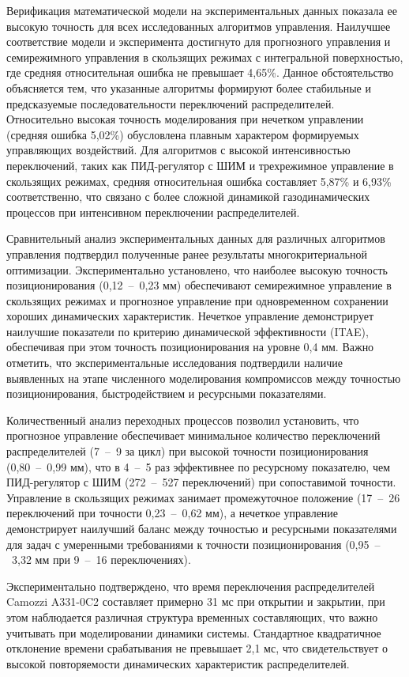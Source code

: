 Верификация математической модели на экспериментальных данных показала ее высокую точность для всех
исследованных алгоритмов управления. Наилучшее соответствие модели и эксперимента достигнуто для прогнозного
управления и семирежимного управления в скользящих режимах с интегральной поверхностью, где средняя относительная
ошибка не превышает 4,65\%. Данное обстоятельство объясняется тем, что указанные алгоритмы формируют более стабильные
и предсказуемые последовательности переключений распределителей. Относительно высокая точность моделирования при
нечетком управлении (средняя ошибка 5,02\%) обусловлена плавным характером формируемых управляющих воздействий. Для алгоритмов
с высокой интенсивностью переключений, таких как ПИД-регулятор с ШИМ и трехрежимное управление в скользящих режимах, средняя
относительная ошибка составляет 5,87\% и 6,93\% соответственно, что связано с более сложной динамикой газодинамических
процессов при интенсивном переключении распределителей.

Сравнительный анализ экспериментальных данных для различных алгоритмов управления подтвердил полученные ранее результаты
многокритериальной оптимизации. Экспериментально установлено, что наиболее высокую точность позиционирования (0,12~--~0,23 мм) обеспечивают
семирежимное управление в скользящих режимах и прогнозное управление при одновременном сохранении хороших динамических характеристик.
Нечеткое управление демонстрирует наилучшие показатели по критерию динамической эффективности (ITAE), обеспечивая при этом точность
позиционирования на уровне 0,4 мм. Важно отметить, что экспериментальные исследования подтвердили наличие выявленных на этапе численного
моделирования компромиссов между точностью позиционирования, быстродействием и ресурсными показателями.

Количественный анализ переходных процессов позволил установить, что прогнозное управление обеспечивает минимальное
количество переключений распределителей (7~--~9 за цикл) при высокой точности позиционирования (0,80~--~0,99 мм), что в 4~--~5 раз эффективнее
по ресурсному показателю, чем ПИД-регулятор с ШИМ (272~--~527 переключений) при сопоставимой точности. Управление в скользящих
режимах занимает промежуточное положение (17~--~26 переключений при точности 0,23~--~0,62 мм), а нечеткое управление демонстрирует
наилучший баланс между точностью и ресурсными показателями для задач с умеренными требованиями к точности позиционирования (0,95~--~3,32 мм при 9~--~16 переключениях).

Экспериментально подтверждено, что время переключения распределителей Camozzi A331-0C2 составляет примерно 31
мс при открытии и закрытии, при этом наблюдается различная структура временных составляющих, что важно учитывать
при моделировании динамики системы. Стандартное квадратичное отклонение времени срабатывания не превышает 2,1 мс,
что свидетельствует о высокой повторяемости динамических характеристик распределителей.


